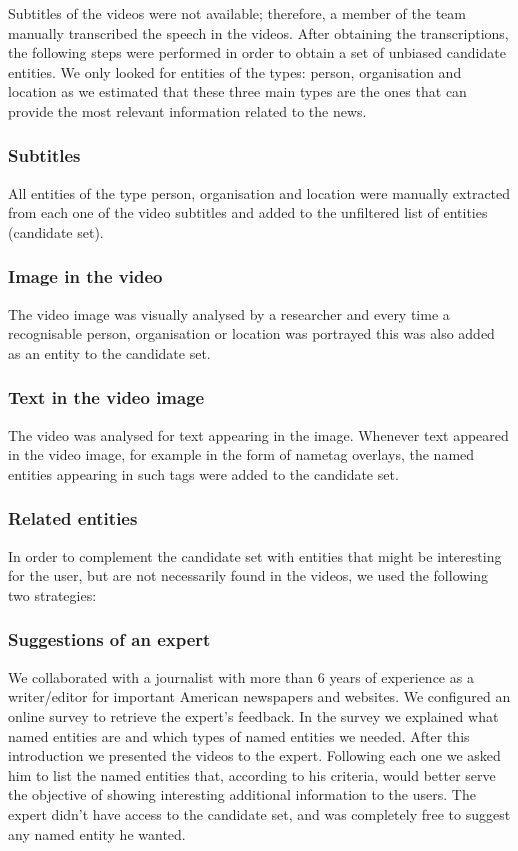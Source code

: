 \documentclass{llncs}
\begin{document}
Subtitles of the videos were not available; therefore, a member of the team manually transcribed the speech in the videos.  After obtaining the transcriptions, the following steps were performed in order to obtain a set of unbiased candidate entities. We only looked for entities of the types: person, organisation and location as we estimated that these three main types are the ones that can provide the most relevant information related to the news.  

\subsubsection{Subtitles}
All entities of the type person, organisation and location were manually extracted from each one of the video subtitles and added to the unfiltered list of entities (candidate set). 

\subsubsection{Image in the video}
The video image was visually analysed by a researcher and every time a recognisable person, organisation or location was portrayed this was also added as an entity to the candidate set. 

\subsubsection{Text in the video image}
The video was analysed for text appearing in the image. Whenever text appeared in the video image, for example in the form of nametag overlays, the named entities appearing in such tags were added to the candidate set. 

\subsubsection{Related entities }
In order to complement the candidate set with entities that might be interesting for the user, but are not necessarily found in the videos, we used the following two strategies:

\subsubsection{Suggestions of an expert}
We collaborated with a journalist with more than 6 years of experience as a writer/editor for important American newspapers and websites.  We configured an online survey to retrieve the expert’s feedback. In the survey we explained what named entities are and which types of named entities we needed. After this introduction we presented the videos to the expert. Following each one we asked him to list the named entities that, according to his criteria, would better serve the objective of showing interesting additional information to the users. The expert didn’t have access to the candidate set, and was completely free to suggest any named entity he wanted. 
\end{document}

